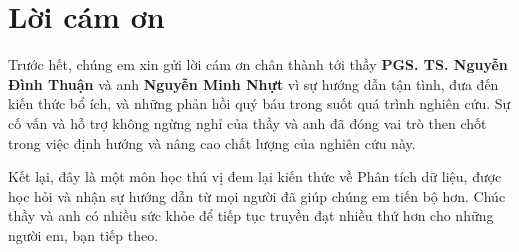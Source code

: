 \section*{Lời cám ơn}

Trước hết, chúng em xin gửi lời cám ơn chân thành tới thầy \textbf{PGS. TS. Nguyễn Đình Thuận} và anh \textbf{Nguyễn Minh Nhựt} vì sự hướng dẫn tận tình, đưa đến kiến thức bổ ích, và những phản hồi quý báu trong suốt quá trình nghiên cứu. Sự cố vấn và hỗ trợ không ngừng nghỉ của thầy và anh đã đóng vai trò then chốt trong việc định hướng và nâng cao chất lượng của nghiên cứu này.

Kết lại, đây là một môn học thú vị đem lại kiến thức về Phân tích dữ liệu, được học hỏi và nhận sự hướng dẫn từ mọi người đã giúp chúng em tiến bộ hơn. Chúc thầy và anh có nhiều sức khỏe để tiếp tục truyền đạt nhiều thứ hơn cho những người em, bạn tiếp theo.